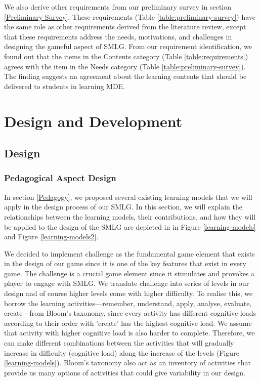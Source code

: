 \documentclass[12pt, a4paper]{report} \usepackage[titletoc]{appendix}
\begin{document}
We also derive other requirements from our preliminary survey in section \ref{Preliminary Survey}. 
These requirements (Table \ref{table:preliminary-survey}) have the same role as other requirements 
derived from the literature review, except that these requirements address the needs, motivations, 
and challenges in designing the gameful aspect of SMLG. From our requirement identification, we found out that the items in the Contents category (Table \ref{table:requirements}) agrees with the item in the Needs category (Table \ref{table:preliminary-survey}). The finding suggests an agreement about the learning contents that should be delivered to students in learning MDE.



\section{Design and Development}

\subsection{Design}

\subsubsection{Pedagogical Aspect Design}
In section \ref{Pedagogy}, we proposed several existing learning models that we will apply in the design process of our SMLG. In this section, we will explain the relationships between the learning models, their contributions, and how they will be applied to the design of the SMLG are depicted in in Figure \ref{learning-models} and Figure \ref{learning-models2}.

We decided to implement challenge as the fundamental game element that exists in the design of our game since it is one of the key features that exist in every game. The challenge is a crucial game element since it stimulates and provokes a player to engage with SMLG. We translate challenge into series of levels in our design and of course higher levels come with higher difficulty. To realise this, we borrow the learning activities---remember, understand, apply, analyse, evaluate, create---from Bloom's taxonomy, since every activity has different cognitive loads according to their order with 'create' has the highest cognitive load. We assume that activity with higher cognitive load is also harder to complete. Therefore, we can make different combinations between the activities that will gradually increase in difficulty (cognitive load) along the increase of the levels (Figure \ref{learning-models}). Bloom's taxonomy also act as an inventory of activities that provide us many options of activities that could give variability in our design. 
\end{document}
